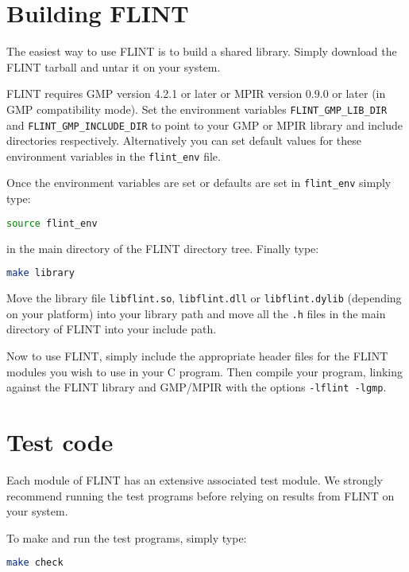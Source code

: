 \documentclass[a4paper,10pt]{book}
\newcommand{\code}{\lstinline}
\begin{document}
\section{Building FLINT}

The easiest way to use FLINT is to build a shared library.  Simply download 
the FLINT tarball and untar it on your system.

FLINT requires GMP version 4.2.1 or later or MPIR version 0.9.0 or 
later (in GMP compatibility mode).  Set the environment variables 
\code{FLINT_GMP_LIB_DIR} and \code{FLINT_GMP_INCLUDE_DIR} to point 
to your GMP or MPIR library and include directories respectively. 
Alternatively you can set default values for these environment variables 
in the \code{flint_env} file.

Once the environment variables are set or defaults are set in 
\code{flint_env} simply type:

\begin{lstlisting}[language=bash]
source flint_env
\end{lstlisting}

in the main directory of the FLINT directory tree.  Finally type:

\begin{lstlisting}[language=bash]
make library
\end{lstlisting}

Move the library file \code{libflint.so}, \code{libflint.dll} or 
\code{libflint.dylib} (depending on your platform) into your library 
path and move all the \code{.h} files in the main directory of FLINT 
into your include path.

Now to use FLINT, simply include the appropriate header files for 
the FLINT modules you wish to use in your C program.  Then compile 
your program, linking against the FLINT library and GMP/MPIR with 
the options \code{-lflint -lgmp}.

\section{Test code}

Each module of FLINT has an extensive associated test module.  We 
strongly recommend running the test programs before relying on results 
from FLINT on your system. 

To make and run the test programs, simply type:

\begin{lstlisting}[language=bash]
make check
\end{lstlisting}
\end{document}
